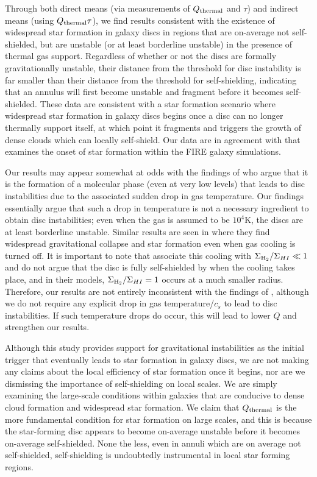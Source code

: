\documentclass[fleqn,usenatbib]{mnras}
\newcommand{\qh}{Q_{\rm thermal}}
\begin{document}
{Through both direct means (via measurements of $\qh$ and $\tau$) and indirect means (using $\qh\tau$), we find results consistent with the existence of widespread star formation in galaxy discs in regions that are on-average not self-shielded, but are unstable (or at least borderline unstable) in the presence of thermal gas support.  Regardless of whether or not the discs are formally gravitationally unstable, their distance from the threshold for disc instability is far smaller than their distance from the threshold for self-shielding, indicating that an annulus will first become unstable and fragment before it becomes self-shielded.  These data are consistent with  a star formation scenario where widespread star formation in galaxy discs begins once a disc can no longer thermally support itself, at which point it fragments and triggers the growth of dense clouds which can locally self-shield.  Our data are in agreement with \citet{Orr17} that examines the onset of star formation within the FIRE galaxy simulations.  

Our results may appear somewhat at odds with the findings of \citet{Schaye04} who argue that it is the formation of a molecular phase (even at very low levels) that leads to disc instabilities due to the associated sudden drop in gas temperature. Our findings essentially argue that such a drop in temperature is not a necessary ingredient to obtain disc instabilities; even when the gas is assumed to be $10^4$K, the discs are at least borderline unstable. Similar results are seen in \citet{Orr17} where they find widespread gravitational collapse and star formation even when gas cooling is turned off. It is important to note that \citet{Schaye04} associate this cooling with $\Sigma_{\rm H_2}/\Sigma_{HI}\ll1$ and do not argue that the disc is fully self-shielded by when the cooling takes place, and in their models, $\Sigma_{\rm H_2}/\Sigma_{HI}=1$ occurs at a much smaller radius.  Therefore, our results are not entirely inconsistent with the findings of \citet{Schaye04}, although we do not require any explicit drop in gas temperature/$c_s$ to lead to disc instabilities.  If such temperature drops do occur, this will lead to lower $Q$ and strengthen our results.

Although this study provides support for gravitational instabilities as the initial trigger that eventually leads to star formation in galaxy discs, we are not making any claims about the local efficiency of star formation once it begins, nor are we dismissing the importance of self-shielding on local scales.  We are simply examining the large-scale conditions within galaxies that are conducive to dense cloud formation and widespread star formation.  We claim that $\qh$ is the more fundamental condition for star formation on large scales, and this is because the star-forming disc appears to become on-average unstable before it becomes on-average self-shielded. None the less, even in annuli which are on average not self-shielded, self-shielding is undoubtedly instrumental in local star forming regions.  

}
\end{document}
